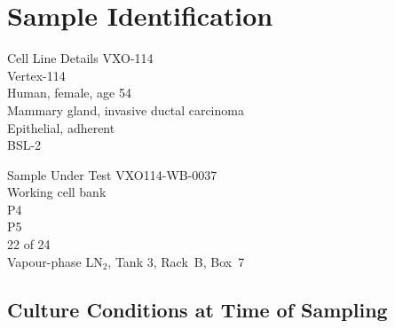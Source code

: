 
\section{Sample Identification}

\begin{minipage}[t]{0.48\textwidth}
  \begin{recordbox}{Cell Line Details}
     VXO-114\\{}
     Vertex-114\\{}
     Human, female, age 54\\{}
     Mammary gland, invasive ductal carcinoma\\{}
     Epithelial, adherent\\{}
     BSL-2
  \end{recordbox}
\end{minipage}%
\hfill
\begin{minipage}[t]{0.48\textwidth}
  \begin{recordbox}{Sample Under Test}
     VXO114-WB-0037\\{}
     Working cell bank\\{}
     P4\\{}
     P5\\{}
     22 of 24\\{}
     Vapour-phase LN$_2$, Tank 3, Rack~B, Box~7
  \end{recordbox}
\end{minipage}
\par

\subsection{Culture Conditions at Time of Sampling}

